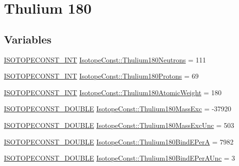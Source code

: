 \hypertarget{group___isotope_const-_thulium-_tm180}{}\section{Thulium 180}
\label{group___isotope_const-_thulium-_tm180}
\subsection*{Variables}
\begin{DoxyCompactItemize}
\item 
\mbox{\hyperlink{group___isotope_const-_macros_ga5f18360b3e99483a35c32d789e62621c}{I\+S\+O\+T\+O\+P\+E\+C\+O\+N\+S\+T\+\_\+\+I\+NT}} \mbox{\hyperlink{group___isotope_const-_thulium-_tm180_ga25dccaf5c4bfcd2d622b3df141aaee9d}{Isotope\+Const\+::\+Thulium180\+Neutrons}} = 111
\item 
\mbox{\hyperlink{group___isotope_const-_macros_ga5f18360b3e99483a35c32d789e62621c}{I\+S\+O\+T\+O\+P\+E\+C\+O\+N\+S\+T\+\_\+\+I\+NT}} \mbox{\hyperlink{group___isotope_const-_thulium-_tm180_ga02a62622dc748bb4cfaa30ab02155e18}{Isotope\+Const\+::\+Thulium180\+Protons}} = 69
\item 
\mbox{\hyperlink{group___isotope_const-_macros_ga5f18360b3e99483a35c32d789e62621c}{I\+S\+O\+T\+O\+P\+E\+C\+O\+N\+S\+T\+\_\+\+I\+NT}} \mbox{\hyperlink{group___isotope_const-_thulium-_tm180_ga961312c30461354162301f02e1398ad9}{Isotope\+Const\+::\+Thulium180\+Atomic\+Weight}} = 180
\item 
\mbox{\hyperlink{group___isotope_const-_macros_ga8f45a7272ce02c0b4c65c44636ed719a}{I\+S\+O\+T\+O\+P\+E\+C\+O\+N\+S\+T\+\_\+\+D\+O\+U\+B\+LE}} \mbox{\hyperlink{group___isotope_const-_thulium-_tm180_ga1391e4683bd75735f4ec59b8a9ed36d0}{Isotope\+Const\+::\+Thulium180\+Mass\+Exc}} = -\/37920
\item 
\mbox{\hyperlink{group___isotope_const-_macros_ga8f45a7272ce02c0b4c65c44636ed719a}{I\+S\+O\+T\+O\+P\+E\+C\+O\+N\+S\+T\+\_\+\+D\+O\+U\+B\+LE}} \mbox{\hyperlink{group___isotope_const-_thulium-_tm180_ga222ad1130cd30e5d3abaf7d3bf57ac78}{Isotope\+Const\+::\+Thulium180\+Mass\+Exc\+Unc}} = 503
\item 
\mbox{\hyperlink{group___isotope_const-_macros_ga8f45a7272ce02c0b4c65c44636ed719a}{I\+S\+O\+T\+O\+P\+E\+C\+O\+N\+S\+T\+\_\+\+D\+O\+U\+B\+LE}} \mbox{\hyperlink{group___isotope_const-_thulium-_tm180_ga921765a8ca396eb8d3ed998705e91293}{Isotope\+Const\+::\+Thulium180\+Bind\+E\+PerA}} = 7982
\item 
\mbox{\hyperlink{group___isotope_const-_macros_ga8f45a7272ce02c0b4c65c44636ed719a}{I\+S\+O\+T\+O\+P\+E\+C\+O\+N\+S\+T\+\_\+\+D\+O\+U\+B\+LE}} \mbox{\hyperlink{group___isotope_const-_thulium-_tm180_ga5e597cf8cc6c4f43aa86dcdf2f5f230b}{Isotope\+Const\+::\+Thulium180\+Bind\+E\+Per\+A\+Unc}} = 3

\end{DoxyCompactItemize}
